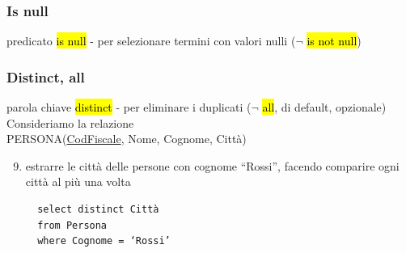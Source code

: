 \documentclass[a4paper]{article}
\begin{document}
\subsubsection{Is null}
predicato \hl{is null} - per selezionare termini con valori nulli ($\neg$ \hl{is not null})

\subsubsection{Distinct, all}
parola chiave \hl{distinct} - per eliminare i duplicati ($\neg$ \hl{all}, di default, opzionale)\medskip\medskip\medskip\\
%
Consideriamo la relazione\\
PERSONA(\underline{CodFiscale}, Nome, Cognome, Città)
%
\begin{enumerate}[leftmargin=*]
  \setcounter{enumi}{8}
  \item estrarre le città delle persone con cognome “Rossi”, facendo comparire ogni città al più una volta
  \begin{verbatim}
  select distinct Città
  from Persona
  where Cognome = ‘Rossi’
  \end{verbatim}
\end{enumerate}
\end{document}
